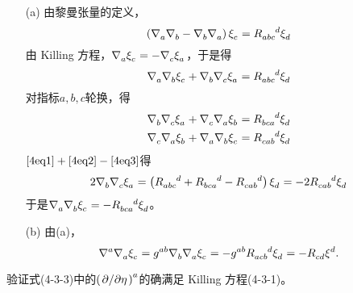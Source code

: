 \begin{xiti}
	\begin{zm}
		\begin{enumerate}
			\item[(a)] 由黎曼张量的定义，
			\begin{equation*}
			\left(\Nabla{a}\Nabla{b} - \Nabla{b}\Nabla{a} \right) \tensor{\xi}{_c} = \tensor{R}{_a_b_c^d} \tensor{\xi}{_d}
			\end{equation*}
			由 Killing 方程，$\Nabla{a}\tensor{\xi}{_c} = - \Nabla{c} \tensor{\xi}{_a} $，于是得
			\begin{equation}
			\Nabla{a}\Nabla{b}\tensor{\xi}{_c} + \Nabla{b}\Nabla{c}\tensor{\xi}{_a}= \tensor{R}{_a_b_c^d} \tensor{\xi}{_d}\label{4eq1}
			\end{equation}
			对指标$a,b,c$轮换，得
			\begin{gather}
			\Nabla{b}\Nabla{c}\tensor{\xi}{_a} + \Nabla{c}\Nabla{a}\tensor{\xi}{_b}= \tensor{R}{_b_c_a^d} \tensor{\xi}{_d}\label{4eq2}\\
			\Nabla{c}\Nabla{a}\tensor{\xi}{_b} + \Nabla{a}\Nabla{b}\tensor{\xi}{_c}= \tensor{R}{_c_a_b^d} \tensor{\xi}{_d}\label{4eq3}
			\end{gather}
			$\eqref{4eq1}+\eqref{4eq2}-\eqref{4eq3}$得
			\begin{displaymath}
			2\Nabla{b}\Nabla{c}\tensor{\xi}{_a}=\left( \tensor{R}{_a_b_c^d} + \tensor{R}{_b_c_a^d} - \tensor{R}{_c_a_b^d} \right) \tensor{\xi}{_d}=-2 \tensor{R}{_c_a_b^d} \tensor{\xi}{_d}
			\end{displaymath}
			于是$\Nabla{a}\Nabla{b}\tensor{\xi}{_c} = - \tensor{R}{_b_c_a^d} \tensor{\xi}{_d} $。
			\item[(b)] 由(a)，
			\begin{displaymath}
			\tensor{\nabla}{^a}\Nabla{a} \tensor{\xi}{_c} = \tensor{g}{^a^b} \Nabla{b} \Nabla{a} \tensor{\xi}{_c} = -\tensor{g}{^a^b} \tensor{R}{_a_c_b^d} \tensor{\xi}{_d}=- \tensor{R}{_c_d} \tensor{\xi}{^d}.
			\end{displaymath}
		\end{enumerate}
	\end{zm}

	\item 验证式(4-3-3)中的$ \tensor{\left(\pd{\eta}\right)}{^a}$的确满足 Killing 方程(4-3-1)。


\end{xiti}
